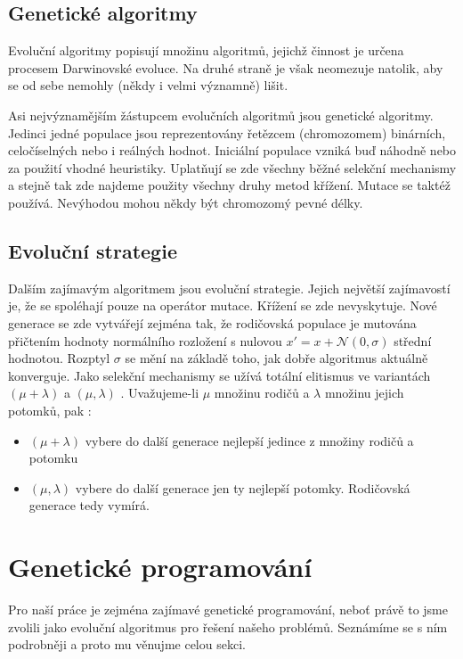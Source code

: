 \subsection{Genetické algoritmy}

Evoluční algoritmy popisují množinu algoritmů, jejichž činnost je určena procesem Darwinovské
evoluce. Na druhé straně je však neomezuje natolik, aby se od sebe nemohly (někdy i velmi
významně) lišit.

Asi nejvýznamějším žástupcem evolučních algoritmů jsou genetické algoritmy. Jedinci jedné populace
jsou reprezentovány řetězcem (chromozomem) binárních, celočíselných nebo i reálných hodnot.
Iniciální populace vzniká buď náhodně nebo za použití vhodné heuristiky. Uplatňují se zde všechny
běžné selekční mechanismy a stejně tak zde najdeme použity všechny druhy metod křížení.
Mutace se taktéž používá. Nevýhodou mohou někdy být chromozomý pevné délky.

\subsection{Evoluční strategie}

Dalším zajímavým algoritmem jsou evoluční strategie. Jejich největší zajímavostí je, že
se spoléhají pouze na operátor mutace. Křížení se zde nevyskytuje. Nové generace se zde
vytvářejí zejména tak, že rodičovská populace je mutována přičtením hodnoty normálního rozložení s nulovou
$x' = x + \mathcal{N}(0, \sigma)$
střední hodnotou. Rozptyl $\sigma$ se mění na základě toho, jak dobře algoritmus aktuálně
konverguje. Jako selekční mechanismy se užívá totální elitismus ve variantách $(\mu + \lambda)$
a $(\mu, \lambda)$ \cite{ES}. Uvažujeme-li $\mu$ množinu rodičů a $\lambda$ množinu jejich
potomků, pak :

\begin{itemize}
	\item $(\mu + \lambda)$ vybere do další generace nejlepší jedince z množiny
		rodičů a potomku
	\item $(\mu, \lambda)$ vybere do další generace jen ty nejlepší potomky. Rodičovská
		generace tedy vymírá.
\end{itemize} 

\section{Genetické programování}

Pro naší práce je zejména zajímavé genetické programování, neboť právě to jsme zvolili 
jako evoluční algoritmus pro řešení našeho problémů. Seznámíme se s ním podrobněji a 
proto mu věnujme celou sekci.

